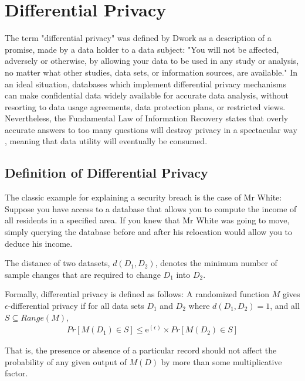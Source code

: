\section{Differential Privacy}
\label{section:differential_privacy}
The term "differential privacy" was defined by Dwork as a description of a promise, made by a data holder to a data subject: "You will not be affected, adversely or otherwise, by allowing your data to be used in any study or analysis, no matter what other studies, data sets, or information sources, are available." \cite{dwork2013algorithmic}
In an ideal situation, databases which implement differential privacy mechanisms can make confidential data widely available for accurate data analysis, without resorting to data usage agreements, data protection plans, or restricted views. Nevertheless, the Fundamental Law of Information Recovery states that overly accurate answers to too many questions will destroy privacy in a spectacular way \cite{dwork2013algorithmic}, meaning that data utility will eventually be consumed.

\subsection{Definition of Differential Privacy}
The classic example for explaining a security breach is the case of Mr White: Suppose you have access to a database that allows you to compute the income of all residents in a specified area. If you knew that Mr White was going to move, simply querying the database before and after his relocation would allow you to deduce his income. 

\begin{definition} The distance of two datasets, $d(D_1, D_2)$, denotes the minimum number of sample changes that are required to change $D_1$ into $D_2$.
\end{definition}

Formally, differential privacy is defined as follows:
A randomized function $M$ gives $\epsilon$-differential privacy if for all data sets $D_1$ and $D_2$ where $d(D_1, D_2)=1$, and all $S\subseteq Range(M)$,
\begin{eqnarray} \label{DiffPrivDef}
 Pr[M(D_1)\in S]\leq \mathrm{e}^{(\epsilon)}\times Pr[M(D_2)\in S]
 \end{eqnarray}

That is, the presence or absence of a particular record should not affect the probability of any given output of $M(D)$ by more than some multiplicative factor. 

